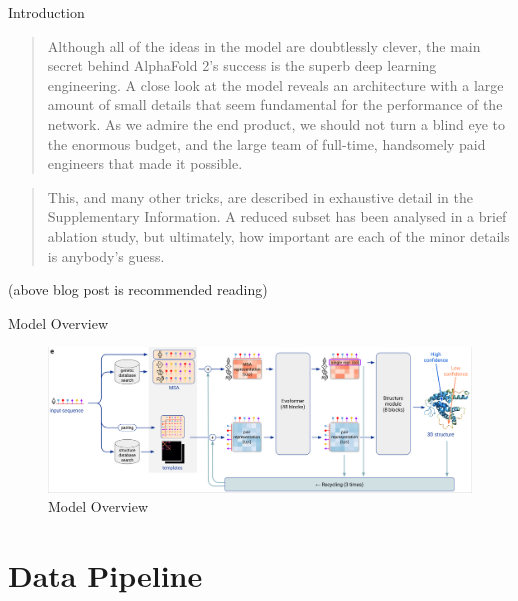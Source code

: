 \documentclass[presentation, smaller]{beamer}
\begin{document}
\begin{frame}[label={sec:orgd1d1c3f}]{Introduction}
  \begin{quote}
    Although all of the ideas in the model are doubtlessly clever, the main secret
    behind AlphaFold 2’s success is the superb deep learning engineering. A close
    look at the model reveals an architecture with a large amount of small details
    that seem fundamental for the performance of the network. As we admire the end
    product, we should not turn a blind eye to the enormous budget, and the large
    team of full-time, handsomely paid engineers that made it possible.~\cite{rubieraAlphaFoldHereWhat}
  \end{quote}
  
  \begin{quote}
    This, and many other tricks, are described in exhaustive detail in the Supplementary Information. A reduced subset has been analysed in a brief ablation study, but ultimately, how important are each of the minor details is anybody’s guess.~\cite{rubieraAlphaFoldHereWhat}
  \end{quote}
  \raggedright{(above blog post is recommended reading)}
\end{frame}


\begin{frame}[label={sec:org1806ac2}]{Model Overview}
\begin{center}
  \begin{figure}
    \includegraphics[width=.8\linewidth]{./imgs/model-overview.png}
    \caption{Model Overview~\cite{jumperHighlyAccurateProtein2021}}
    \label{fig:modeloverview}
  \end{figure}
\end{center}
\end{frame}

\section*{Data Pipeline}
\label{sec:orgd17a124}
\end{document}

